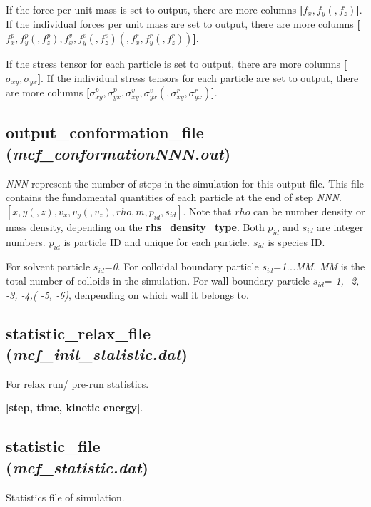 \documentclass[a4paper,10pt]{article}
\begin{document}
If the force per unit mass is set to output,
there are more columns
\textbf{[$f_x, f_y(, f_z)$]}.
If the individual forces per unit mass are set to output,
there are more columns
\textbf{[$f^p_x, f^p_y(, f^p_z),f^v_x, f^v_y(, f^v_z)(,f^r_x, f^r_y(, f^r_z))$]}.


If the stress tensor for each particle is set to output,
there are more columns
\textbf{[$\sigma_{xy}, \sigma_{yx}$]}.
If the individual stress tensors for each particle are set to output,
there are more columns
\textbf{[$\sigma^p_{xy}, \sigma^p_{yx}, \sigma^v_{xy}, \sigma^v_{yx}(,\sigma^r_{xy}, \sigma^r_{yx})$]}.


\subsection{\textbf{output\_conformation\_file}\\
(\textit{mcf\_conformationNNN.out})}
\textit{NNN} represent the number of steps in the simulation for this output file.
This file contains the fundamental quantities of each particle
at the end of step \textit{NNN}.
\textbf{$[x, y(, z), v_x, v_y(, v_z), rho, m, p_{id}, s_{id}]$}.
Note that \textbf{$rho$} can be number density or mass density,
depending on the \textbf{rhs\_density\_type}.
Both \textbf{$p_{id}$} and \textbf{$s_{id}$} are integer numbers.
\textbf{$p_{id}$} is particle ID and
unique for each particle.
\textbf{$s_{id}$} is species ID.

For solvent particle \textbf{$s_{id}$}=\textit{0}.
For colloidal boundary particle \textbf{$s_{id}$}=\textit{1...\textit{MM}}.
\textit{MM} is the total number of colloids
in the simulation.
For wall boundary particle \textbf{$s_{id}$}=\textit{-1, -2, -3, -4,( -5, -6)},
denpending on which wall it belongs to.


\subsection{\textbf{statistic\_relax\_file}\\
(\textit{mcf\_init\_statistic.dat})}
For relax run/ pre-run statistics.

\textbf{[step, time, kinetic energy]}.

\subsection{\textbf{statistic\_file}\\
(\textit{mcf\_statistic.dat})}
Statistics file of simulation.
\end{document}

